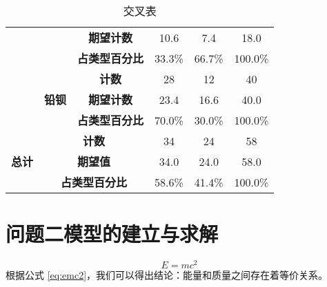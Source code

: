 \documentclass[withoutpreface,bwprint]{cumcmthesis} %
\begin{document}
 
\begin{table}[H]
	\centering
	\caption{交叉表}\label{tab:001} \centering
	\setlength{\tabcolsep}{6mm}%
	\begin{tabular}{c|cc|ccc} 
		\toprule[1.5pt]
	\midrule[1pt]
	&                   &        \textbf{期望计数}           &     10.6            &            7.4      &     18.0              \\
	&                   &             \textbf{占类型百分比}      &           33.3\%       &     66.7\%             &        100.0\%           \\ 
	\cline{2-3}
	& \multirow{3}{*}{\textbf{铅钡}} &              \textbf{计数}    &         28       &  12              &   40                \\
	&                   &                \textbf{期望计数}  &            23.4      &     16.6             &   40.0                \\
	&                   &                \textbf{占类型百分比}  &      70.0\%            &           30.0\%       &    100.0\%               \\ 
	\cline{1-3}
	\multirow{3}{*}{\textbf{总计}}                 & \multicolumn{2}{c|}{\textbf{计数}}                &     34             &      24            &           58        \\
	& \multicolumn{2}{c|}{\textbf{期望值}}                & 34.0                &           24.0       &           58.0        \\
	& \multicolumn{2}{c|}{\textbf{占类型百分比}}                &        58.6\%          &      41.4\%            &        100.0\%           \\
	\bottomrule[1.5pt]
	\end{tabular}
\end{table}
 
 
 
 
 
\section{问题二模型的建立与求解}
\begin{equation}
	E = mc^2 \label{eq:emc2}
\end{equation}
根据公式 \eqref{eq:emc2}，我们可以得出结论：能量和质量之间存在着等价关系。
\end{document}
